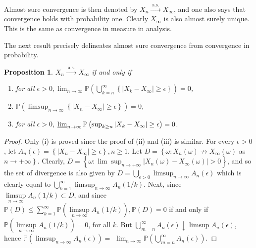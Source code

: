 \documentclass{amsbook}
\theoremstyle{plain}%
\newtheorem{prop}[thm]{Proposition}
\theoremstyle{definition}
\theoremstyle{remark}
\begin{document}
Almost sure convergence is then denoted by $X_{n} \xrightarrow{\text { a.s. }} X_{\infty}$, and one also says that convergence holds with probability one. Clearly $X_{\infty}$ is also almost surely unique. This is the same as convergence in measure in analysis.

The next result precisely delineates almost sure convergence from convergence in probability.

\begin{prop} $X_{n} \xrightarrow{\text { a.s. }} X_{\infty}$ if and only if
  \begin{enumerate}
    \item[(i)] for all $\epsilon>0, \lim _{n \rightarrow \infty} \mathbb{P}\left(\bigcup_{k=n}^{\infty}\left\{\left|X_{k}-X_{\infty}\right| \geq \epsilon\right\}\right)=0$,
    \item[(ii)] $\mathbb{P}\left(\limsup _{n \rightarrow \infty}\left\{\left|X_{n}-X_{\infty}\right| \geq \epsilon\right\}\right)=0$,
    \item[(iii)] for all $\epsilon>0$, $\varliminf_{n \rightarrow \infty} \mathbb{P}\left(\sup _{k \geq n}\left|X_{k}-X_{\infty}\right| \geq \epsilon\right)=0$.
  \end{enumerate}
\end{prop}

\begin{proof}
  Only (i) is proved since the proof of (ii) and (iii) is similar. For every $\epsilon>0$, let $A_{n}(\epsilon)=\left\{\left|X_{n}-X_{\infty}\right| \geq \epsilon\right\}, n \geq 1$. Let $D=\left\{\omega: X_{n}(\omega) \nrightarrow X_{\infty}(\omega)\right.$ as $\left.n \rightarrow+\infty\right\}$. Clearly, $D=\left\{\omega: \lim \sup _{n \rightarrow+\infty}\left|X_{n}(\omega)-X_{\infty}(\omega)\right|>0\right\}$, and so the set of divergence is also given by $D=\bigcup_{\epsilon>0} \limsup _{n \rightarrow \infty} A_{n}(\epsilon)$ which is clearly equal to $\bigcup_{k=1}^{\infty} \limsup _{n \rightarrow \infty} A_{n}(1 / k)$. Next, since $\underset{n \rightarrow \infty}{\limsup } A_{n}(1 / k) \subset D$, and since $\mathbb{P}(D) \leq \sum_{k=1}^{\infty} \mathbb{P}\left(\underset{n \rightarrow \infty}{\limsup } A_{n}(1 / k)\right), \mathbb{P}(D)=0$ if and only if $\mathbb{P}\left(\underset{n \rightarrow \infty}{\limsup } A_{n}(1 / k)\right)=0$, for all $k$. But $\bigcup_{m=n}^{\infty} A_{n}(\epsilon) \downarrow \limsup A_{n}(\epsilon)$, hence $\mathbb{P}\left(\limsup _{n \rightarrow \infty} A_{n}(\epsilon)\right)=$ $\lim _{n \rightarrow \infty} \mathbb{P}\left(\bigcup_{m=n}^{\infty} A_{n}(\epsilon)\right)$.
\end{proof}
\end{document}
